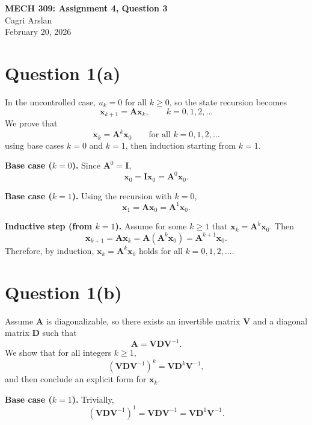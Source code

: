 \documentclass[11pt]{article}
\begin{document}
\begin{center}
{\Large \textbf{MECH 309: Assignment 4, Question 3}}\\
Cagri Arslan\\
February 20, 2026
\end{center}

\section*{Question 1(a)}

In the uncontrolled case, $u_k=0$ for all $k\ge 0$, so the state recursion becomes
\[
\mathbf{x}_{k+1} = \mathbf{A}\mathbf{x}_k, \qquad k=0,1,2,\dots
\]
We prove that
\[
\mathbf{x}_k = \mathbf{A}^k\mathbf{x}_0 \qquad \text{for all } k=0,1,2,\dots
\]
using base cases $k=0$ and $k=1$, then induction starting from $k=1$.

\textbf{Base case ($k=0$).} Since $\mathbf{A}^0=\mathbf{I}$,
\[
\mathbf{x}_0 = \mathbf{I}\mathbf{x}_0 = \mathbf{A}^0\mathbf{x}_0.
\]

\textbf{Base case ($k=1$).} Using the recursion with $k=0$,
\[
\mathbf{x}_1 = \mathbf{A}\mathbf{x}_0 = \mathbf{A}^1\mathbf{x}_0.
\]

\textbf{Inductive step (from $k=1$).} Assume for some $k\ge 1$ that $\mathbf{x}_k = \mathbf{A}^k\mathbf{x}_0$. Then
\[
\mathbf{x}_{k+1} = \mathbf{A}\mathbf{x}_k
= \mathbf{A}(\mathbf{A}^k\mathbf{x}_0)
= \mathbf{A}^{k+1}\mathbf{x}_0.
\]
Therefore, by induction, $\mathbf{x}_k = \mathbf{A}^k\mathbf{x}_0$ holds for all $k=0,1,2,\dots$.

\section*{Question 1(b)}

Assume $\mathbf{A}$ is diagonalizable, so there exists an invertible matrix $\mathbf{V}$ and a diagonal matrix $\mathbf{D}$ such that
\[
\mathbf{A} = \mathbf{V}\mathbf{D}\mathbf{V}^{-1}.
\]
We show that for all integers $k\ge 1$,
\[
(\mathbf{V}\mathbf{D}\mathbf{V}^{-1})^k = \mathbf{V}\mathbf{D}^k\mathbf{V}^{-1},
\]
and then conclude an explicit form for $\mathbf{x}_k$.

\textbf{Base case ($k=1$).} Trivially,
\[
(\mathbf{V}\mathbf{D}\mathbf{V}^{-1})^1
= \mathbf{V}\mathbf{D}\mathbf{V}^{-1}
= \mathbf{V}\mathbf{D}^1\mathbf{V}^{-1}.
\]
\end{document}
